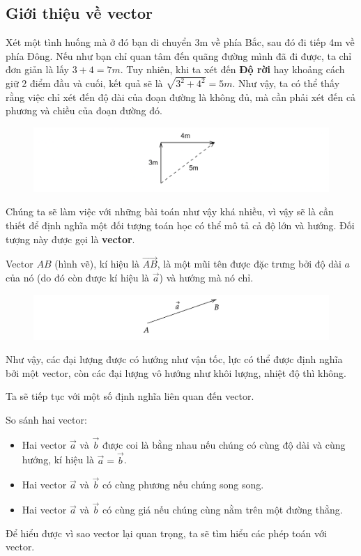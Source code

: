 \subsection{Giới thiệu về vector}
Xét một tình huống mà ở đó bạn di chuyển 3m về phía Bắc, sau đó đi tiếp 4m về phía Đông. Nếu như bạn chỉ quan tâm đến quãng đường mình đã đi được, ta chỉ đơn giản là lấy \(3+4=7\si{m}\). Tuy nhiên, khi ta xét đến \textbf{Độ rời} hay khoảng cách giữ 2 điểm đầu và cuối, kết quả sẽ là \(\sqrt{3^2+4^2}=5\si{m}\). Như vậy, ta có thể thấy rằng việc chỉ xét đến độ dài của đoạn đường là không đủ, mà cần phải xét đến cả phương và chiều của đoạn đường đó.
\begin{figure}[H]
\centering
\includegraphics[width=1\textwidth]{Tuan2/Figures/gioithieuvector.png}
\end{figure}
Chúng ta sẽ làm việc với những bài toán như vậy khá nhiều, vì vậy sẽ là cần thiết để định nghĩa một đối tượng toán học có thể mô tả cả độ lớn và hướng. Đối tượng này được gọi là \textbf{vector}.
\begin{definition} Vector \(AB\) (hình vẽ), kí hiệu là \(\overrightarrow{AB}\), là một mũi tên được đặc trưng bởi độ dài \(a\) của nó (do đó còn được kí hiệu là \(\overrightarrow{a}\)) và hướng mà nó chỉ.
\end{definition}
\begin{figure}[H]
\centering
\includegraphics[width=1\textwidth]{Tuan2/Figures/vectorAB.png}
\end{figure}
Như vậy, các đại lượng được có hướng như vận tốc, lực có thể được định nghĩa bởi một vector, còn các đại lượng vô hướng như khôi lượng, nhiệt độ thì không.

Ta sẽ tiếp tục với một số định nghĩa liên quan đến vector.
\begin{definition}
    So sánh hai vector:
    \begin{itemize}
        \item Hai vector \(\overrightarrow{a}\) và \(\overrightarrow{b}\) được coi là bằng nhau nếu chúng có cùng độ dài và cùng hướng, kí hiệu là \(\overrightarrow{a}=\overrightarrow{b}\).
        \item Hai vector \(\overrightarrow{a}\) và \(\overrightarrow{b}\) có cùng phương nếu chúng song song.
        \item Hai vector \(\overrightarrow{a}\) và \(\overrightarrow{b}\) có cùng giá nếu chúng cùng nằm trên một đường thẳng.
    \end{itemize}
\end{definition}
Để hiểu được vì sao vector lại quan trọng, ta sẽ tìm hiểu các phép toán với vector.

